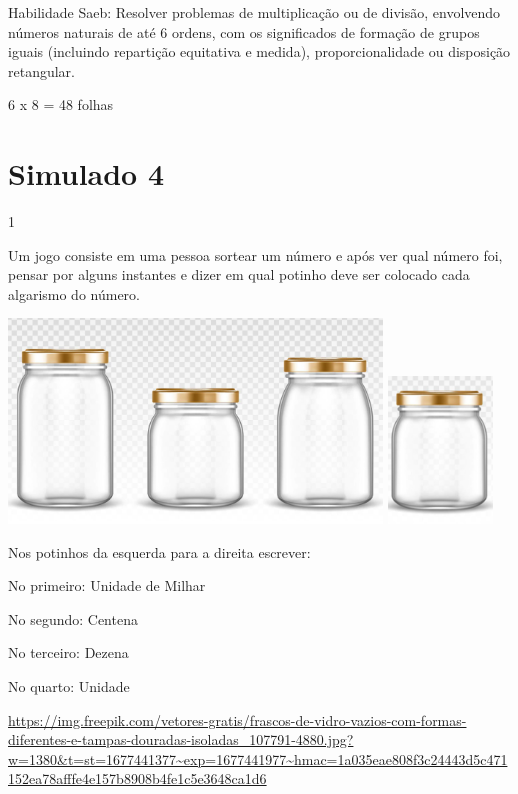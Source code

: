 \begin{escolha}
\begin{escolha}
Habilidade Saeb: Resolver problemas de multiplicação ou de divisão,
envolvendo números naturais de até 6 ordens, com os significados de
formação de grupos iguais (incluindo repartição equitativa e medida),
proporcionalidade ou disposição retangular.

6 x 8 = 48 folhas

\chapter{Simulado 4}

\num{1}

Um jogo consiste em uma pessoa sortear um número e após ver qual número
foi, pensar por alguns instantes e dizer em qual potinho deve ser
colocado cada algarismo do número.

\includegraphics[width=3.90833in,height=2.14168in]{media/image129.png}
\includegraphics[width=1.10010in,height=1.54180in]{media/image130.png}

Nos potinhos da esquerda para a direita escrever:

No primeiro: Unidade de Milhar

No segundo: Centena

No terceiro: Dezena

No quarto: Unidade

\url{https://img.freepik.com/vetores-gratis/frascos-de-vidro-vazios-com-formas-diferentes-e-tampas-douradas-isoladas_107791-4880.jpg?w=1380\&t=st=1677441377~exp=1677441977~hmac=1a035eae808f3c24443d5c471152ea78afffe4e157b8908b4fe1c5e3648ca1d6}


\end{escolha}
\end{escolha}
